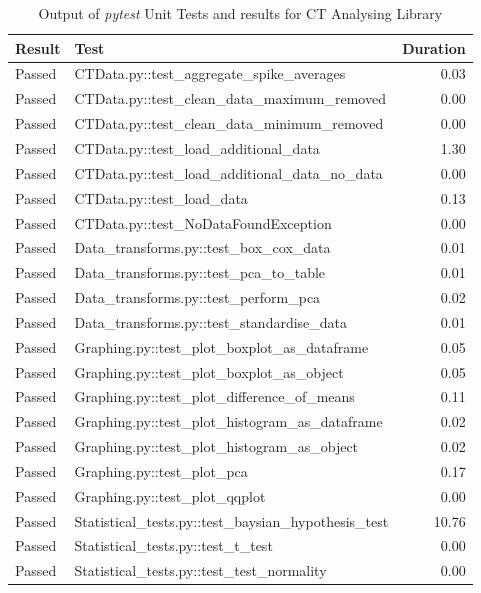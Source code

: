 \documentclass[11pt]{report}
\begin{document}
\begin{table}[htb]
\caption{\label{tab:unittest}Output of \emph{pytest} Unit Tests and results for CT Analysing Library}
\centering
\begin{tabularx}{\textwidth}{|l|X|r|}
\hline
\textbf{Result} & \textbf{Test} & \textbf{Duration}\\
\hline
\color{ForestGreen}Passed & CTData.py::test\_aggregate\_spike\_averages & 0.03\\
\hline
\color{ForestGreen}Passed & CTData.py::test\_clean\_data\_maximum\_removed & 0.00\\
\hline
\color{ForestGreen}Passed & CTData.py::test\_clean\_data\_minimum\_removed & 0.00\\
\hline
\color{ForestGreen}Passed & CTData.py::test\_load\_additional\_data & 1.30\\
\hline
\color{ForestGreen}Passed & CTData.py::test\_load\_additional\_data\_no\_data & 0.00\\
\hline
\color{ForestGreen}Passed & CTData.py::test\_load\_data & 0.13\\
\hline
\color{ForestGreen}Passed & CTData.py::test\_NoDataFoundException & 0.00\\
\hline
\color{ForestGreen}Passed & Data\_transforms.py::test\_box\_cox\_data & 0.01\\
\hline
\color{ForestGreen}Passed & Data\_transforms.py::test\_pca\_to\_table & 0.01\\
\hline
\color{ForestGreen}Passed & Data\_transforms.py::test\_perform\_pca & 0.02\\
\hline
\color{ForestGreen}Passed & Data\_transforms.py::test\_standardise\_data & 0.01\\
\hline
\color{ForestGreen}Passed & Graphing.py::test\_plot\_boxplot\_as\_dataframe & 0.05\\
\hline
\color{ForestGreen}Passed & Graphing.py::test\_plot\_boxplot\_as\_object & 0.05\\
\hline
\color{ForestGreen}Passed & Graphing.py::test\_plot\_difference\_of\_means & 0.11\\
\hline
\color{ForestGreen}Passed & Graphing.py::test\_plot\_histogram\_as\_dataframe & 0.02\\
\hline
\color{ForestGreen}Passed & Graphing.py::test\_plot\_histogram\_as\_object & 0.02\\
\hline
\color{ForestGreen}Passed & Graphing.py::test\_plot\_pca & 0.17\\
\hline
\color{ForestGreen}Passed & Graphing.py::test\_plot\_qqplot & 0.00\\
\hline
\color{ForestGreen}Passed & Statistical\_tests.py::test\_baysian\_hypothesis\_test & 10.76\\
\hline
\color{ForestGreen}Passed & Statistical\_tests.py::test\_t\_test & 0.00\\
\hline
\color{ForestGreen}Passed & Statistical\_tests.py::test\_test\_normality & 0.00\\
\hline
\end{tabularx}
\end{table}
\end{document}
